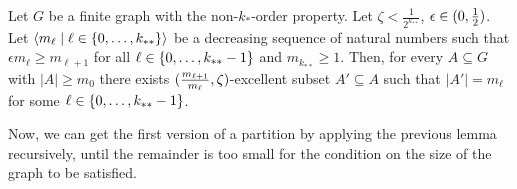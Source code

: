     \begin{lemma}[Claim 5.4.1] \label{lem:existance_of_excellent_subsets_fixed_size_choices}
        Let $G$ be a finite graph with the non-$k_{*}$-order property.
        Let $\zeta < \frac{1}{2^{k_{**}}}$, $\epsilon \in ( 0, \frac{1}{2} )$.
        Let $\left< m_\ell \mid \ell \in \{ 0, \dots, k_{**} \} \right>$ be a decreasing sequence of natural numbers such that
        $\epsilon m_{\ell} \geq m_{\ell+1}$ for all $\ell \in \{ 0, \dots, k_{**}-1 \}$ and $m_{k_{**}} \geq 1$.
        Then, for every $A \subseteq G$ with $|A| \geq m_0$ there exists
        $( \frac{m_{\ell+1}}{m_{\ell}}, \zeta )$-excellent subset $A' \subseteq A$ such that $|A'| = m_\ell$ for
        some $\ell \in \{ 0, \dots, k_{**}-1 \}$.
    \end{lemma}

    Now, we can get the first version of a partition by applying the previous lemma recursively, until the remainder is too
    small for the condition on the size of the graph to be satisfied.

